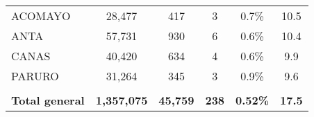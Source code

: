 \begin{tabular}{lccccc}
	\cellcolor[HTML]{FFFF99}ACOMAYO                                 & 28,477               & 417                                  & 3                    & 0.7\%                      & 10.5                                        \\
	\cellcolor[HTML]{FFFF99}ANTA                                    & 57,731               & 930                                  & 6                    & 0.6\%                      & 10.4                                        \\
	\cellcolor[HTML]{FFFF99}CANAS                                   & 40,420               & 634                                  & 4                    & 0.6\%                      & 9.9                                         \\
	\cellcolor[HTML]{FFFF99}PARURO                                  & 31,264               & 345                                  & 3                    & 0.9\%                      & 9.6                                         \\
	& \multicolumn{1}{l}{} & \multicolumn{1}{l}{}                 & \multicolumn{1}{l}{} & \multicolumn{1}{l}{}       & \multicolumn{1}{l}{}                        \\
	\rowcolor[HTML]{DDEBF7} 
	\textbf{Total general}                                          & \textbf{1,357,075}   & \textbf{45,759}                      & \textbf{238}         & \textbf{0.52\%}            & \textbf{17.5}                              
\end{tabular}